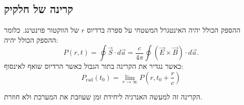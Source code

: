 \documentclass{tstextbook}
\begin{document}
\subsection{קרינה של חלקיק}

\begin{definition}[קרינה]
ההספק הכולל יהיה האינטגרל המשטחי על ספרה ברדיוס \(r\) של הווקטור פוינטינג. כלומר ההספק הכולל יהיה:
$$P\left(r,t\right)=\oint\vec{S}\cdot d\vec{a}={\frac{c}{4\pi}}\oint\left( \vec{E}\times\vec{B} \right)\cdot d\vec{a}.$$
כאשר נגדיר את הקרינה בתור הגבול כאשר הרדיוס שואף לאינסוף:
$$P_{\mathrm{rad}}(t_{0})=\operatorname*{lim}_{r\to\infty}P\left(r,t_{0}+{\frac{r}{c}}\right)$$

\end{definition}
הקרינה זה למעשה האנרגיה ליחידת זמן שעוזבת את המערכת ולא חוזרת.
\end{document}
